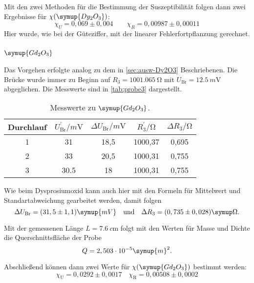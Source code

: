 Mit den zwei Methoden für die Bestimmung der Suszeptibilität folgen dann zwei Ergebnisse
für $\chi(\symup{Dy_2O_3})$:
\begin{equation}
	\chi_U = 0,069 \pm 0,004
	\qquad
	\chi_R = 0,00987 \pm 0,00011
\end{equation}
Hier wurde, wie bei der Güteziffer, mit der linearer Fehlerfortpflanzung gerechnet.

\subsubsection{$\symup{Gd_2O_3}$}

Das Vorgehen erfolgte analog zu dem in \autoref{sec:ausw-Dy2O3} Beschriebenen. Die Brücke
wurde immer zu Beginn auf $R_3 = \SI{1001.065}{\ohm}$ mit $U_\text{Br} =
\SI{12.5}{m\volt}$ abgeglichen. Die Messwerte sind in \autoref{tab:probe3} dargestellt.

\begin{table}
  \centering
  \caption{Messwerte zu $\symup{Gd_2O_3}$.}
  \label{tab:probe3}
  \begin{tabular}{c c c c c}
  \toprule
  Durchlauf &
  $U_\text{Br}^\prime / \si{m\volt}$ &
  $\Delta U_\text{Br} / \si{m\volt}$ &
  $R_3^\prime / \si{\ohm} $ &
  $\Delta R_3 / \si{\ohm} $ \\
  \midrule
  1 & 31 & 18,5 & 1000,37 & 0,695 \\
  2 & 33 & 20,5 & 1000,31 & 0,755 \\
  3 & 30.5 & 18 & 1000,31 & 0,755 \\
  \bottomrule
  \end{tabular}
\end{table}

Wie beim Dysprosiumoxid kann auch hier mit den Formeln für Mittelwert und
Standartabweichung gearbeitet werden, damit folgen 
\begin{equation}
	\Delta U_\text{Br} = (31,5 \pm 1,1) \symup{mV}
	\quad
	\text{und}
	\quad
	\Delta R_3 = (0,735 \pm 0,028) \symup\Omega.
\end{equation}

Mit der gemessenen Länge $L = \SI{7.6}{c\meter}$ folgt mit den Werten für Masse und Dichte
die Querschnittsfläche der Probe
\begin{equation}
	Q = 2,503 \cdot 10^{-5} \symup{m}^2.
\end{equation}

Abschließend können dann zwei Werte für $\chi(\symup{Gd_2O_3})$ bestimmt werden:
\begin{equation}
	\chi_\text{U} = 0,0292 \pm 0,0017
	\quad
	\chi_\text{R} = 0,00508 \pm 0,0002
\end{equation}

